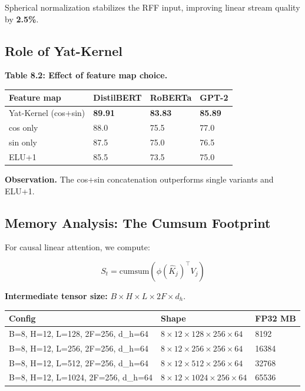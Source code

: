 Spherical normalization stabilizes the RFF input, improving linear stream 
quality by \textbf{2.5\%}.

\subsection{Role of Yat-Kernel}

\textbf{Table 8.2: Effect of feature map choice.}

\begin{table}[H]
\centering
\small
\begin{tabular}{llll}
\toprule
\textbf{Feature map} & \textbf{DistilBERT} & \textbf{RoBERTa} & \textbf{GPT-2} \\
\midrule
Yat-Kernel (cos+sin) & \textbf{89.91} & \textbf{83.83} & \textbf{85.89} \\
cos only & 88.0 & 75.5 & 77.0 \\
sin only & 87.5 & 75.0 & 76.5 \\
ELU+1 & 85.5 & 73.5 & 75.0 \\
\bottomrule
\end{tabular}
\end{table}

\textbf{Observation.} The cos+sin concatenation outperforms single variants and 
ELU+1.

\subsection{Memory Analysis: The Cumsum Footprint}

For causal linear attention, we compute:

\begin{equation}
S_t = \text{cumsum}(\phi(\hat{K}_j)^\top V_j)
\end{equation}

\textbf{Intermediate tensor size:} $B \times H \times L \times 2F \times d_h$.

\begin{table}[H]
\centering
\small
\begin{tabular}{lll}
\toprule
\textbf{Config} & \textbf{Shape} & \textbf{FP32 MB} \\
\midrule
B=8, H=12, L=128, 2F=256, d\_h=64 & $8 \times 12 \times 128 \times 256 \times 64$ & 8192 \\
B=8, H=12, L=256, 2F=256, d\_h=64 & $8 \times 12 \times 256 \times 256 \times 64$ & 16384 \\
B=8, H=12, L=512, 2F=256, d\_h=64 & $8 \times 12 \times 512 \times 256 \times 64$ & 32768 \\
B=8, H=12, L=1024, 2F=256, d\_h=64 & $8 \times 12 \times 1024 \times 256 \times 64$ & 65536 \\
\bottomrule
\end{tabular}
\end{table}

